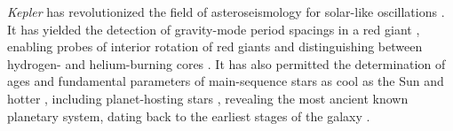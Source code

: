 \documentclass[a4paper,fleqn,usenatbib]{mnras}
\newcommand{\kepler}{\emph{Kepler}\xspace}
\begin{document}
\kepler has revolutionized the field of asteroseismology for solar-like oscillations \citep{2010PASP..122..131G,2010ApJ...713L.169C}. It has yielded the detection of gravity-mode period spacings in a red giant \citep{rggmodes,2014A&A...572L...5M}, enabling probes of interior rotation of red giants \citep{rggmoderotation,2012A&A...548A..10M} and distinguishing between hydrogen- and helium-burning cores \citep{rggmodehelium,2012A&A...540A.143M}. It has also permitted the determination of ages and fundamental parameters of main-sequence stars as cool as the Sun and hotter \citep{silvaages}, including planet-hosting stars \citep{huberplanetages,silvaplanetages,2018MNRAS.479.4786V}, revealing the most ancient known planetary system, dating back to the earliest stages of the galaxy \citep{ancientplanets}. %
\newpage
\end{document}
